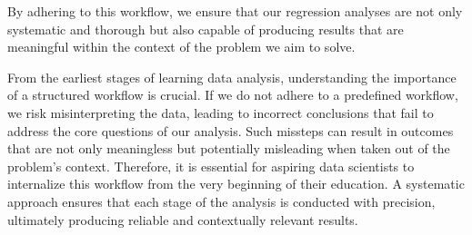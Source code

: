 \documentclass[
  letterpaper,
  DIV=11,
  numbers=noendperiod]{scrreprt}
\begin{document}
By adhering to this workflow, we ensure that our regression analyses are
not only systematic and thorough but also capable of producing results
that are meaningful within the context of the problem we aim to solve.

\begin{tcolorbox}[enhanced jigsaw, bottomrule=.15mm, breakable, colback=white, leftrule=.75mm, coltitle=black, rightrule=.15mm, bottomtitle=1mm, title=\textcolor{quarto-callout-note-color}{\faInfo}\hspace{0.5em}{The Importance of a Formal Structure in Regression Analysis}, opacitybacktitle=0.6, toprule=.15mm, titlerule=0mm, arc=.35mm, colbacktitle=quarto-callout-note-color!10!white, toptitle=1mm, colframe=quarto-callout-note-color-frame, left=2mm, opacityback=0]

From the earliest stages of learning data analysis, understanding the
importance of a structured workflow is crucial. If we do not adhere to a
predefined workflow, we risk misinterpreting the data, leading to
incorrect conclusions that fail to address the core questions of our
analysis. Such missteps can result in outcomes that are not only
meaningless but potentially misleading when taken out of the problem's
context. Therefore, it is essential for aspiring data scientists to
internalize this workflow from the very beginning of their education. A
systematic approach ensures that each stage of the analysis is conducted
with precision, ultimately producing reliable and contextually relevant
results.

\end{tcolorbox}
\end{document}
